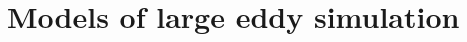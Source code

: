 \documentclass[english, nochinese]{pkupaper}
\begin{document}




\section{Models of large eddy simulation} \label{Sec:LES}
\end{document}
